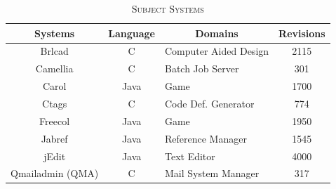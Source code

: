 \documentclass[review]{elsarticle}
\begin{document}
\begin{table}[h] 
\vspace{2mm}
\caption{\label{tab:subject-systems}\textsc{Subject Systems}}
\centering
\begin{tabular}{|c|c|l|c|}
\hline
\textbf{Systems} & \textbf{Language} & \multicolumn{1}{c|}{\textbf{Domains}} & \textbf{Revisions} \\ \hline
Brlcad           & C              & Computer Aided Design                 & 2115               \\ \hline
Camellia         & C              & Batch Job Server                      & 301                \\ \hline
Carol            & Java           & Game                                  & 1700               \\ \hline
Ctags            & C              & Code Def. Generator                   & 774                \\ \hline
Freecol          & Java           & Game                                  & 1950               \\ \hline
Jabref           & Java           & Reference Manager                     & 1545               \\ \hline
jEdit            & Java           & Text Editor                           & 4000               \\ \hline
Qmailadmin (QMA)       & C              & Mail System Manager                   & 317                \\ \hline
\end{tabular}
\end{table}
\end{document}

